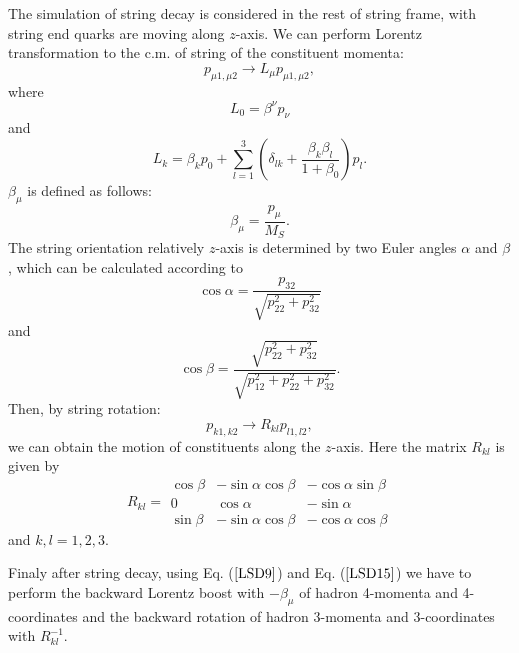 \hspace{1.0em}The simulation of string decay is considered in the
rest of string frame, with string end quarks are moving along $z$-axis.
We can perform Lorentz transformation to the c.m. of string of the
constituent momenta:
\begin{equation}
\label{LSD9} p_{\mu 1,\mu 2}\rightarrow L_{\mu}p_{\mu 1,\mu 2},
\end{equation}
where 
\begin{equation}
\label{LSD10} L_{0}=\beta^{\nu}p_{\nu}
\end{equation}
and 
\begin{equation}
\label{LSD11} L_k=\beta_kp_0 + \sum_{l=1}^{3}(\delta_{lk} +
\frac{\beta_k\beta_l}{1+\beta_0})p_l.
\end{equation}
 $\beta_{\mu}$ is defined as follows:
\begin{equation}
\label{LSD12} \beta_{\mu} = \frac{p_{\mu}}{M_S}.
\end{equation}
The string orientation relatively $z$-axis is determined by two Euler
angles $\alpha$ and $\beta$, which can be calculated according to
\begin{equation}
\label{LSD13} \cos{\alpha}= \frac{p_{32}}{\sqrt{p_{22}^2 + p_{32}^2}}
\end{equation}
and
\begin{equation}
\label{LSD14} \cos{\beta}= \frac{\sqrt{p_{22}^2 + p_{32}^2}}
{\sqrt{p_{12}^2 + p^2_{22} + p_{32}^2}}.
\end{equation}
Then,  by string rotation:
\begin{equation}
\label{LSD15} p_{k1,k2} \rightarrow R_{kl}p_{l1,l2}, 
\end{equation}
we can obtain the motion of constituents along the $z$-axis.  Here the
matrix $R_{kl}$ is given by
\begin{equation}
\label{LSD16} R_{kl}=
\begin{array}{|ccc|}
\cos{\beta} & -\sin{\alpha}\cos{\beta}&
-\cos{\alpha}\sin{\beta}\\
0 & \cos{\alpha}&
-\sin{\alpha}\\
\sin{\beta} & -\sin{\alpha}\cos{\beta}&
-\cos{\alpha}\cos{\beta}
\end{array}
\end{equation}
and $k,l =1,2,3$.

Finaly after string decay, using 
Eq. ($\ref{LSD9}$) and Eq. ($\ref{LSD15}$) we have to
perform the backward Lorentz boost with $-\beta_{\mu}$ of hadron
4-momenta and 4-coordinates and the backward rotation of hadron
3-momenta and 3-coordinates with $R^{-1}_{kl}$.
